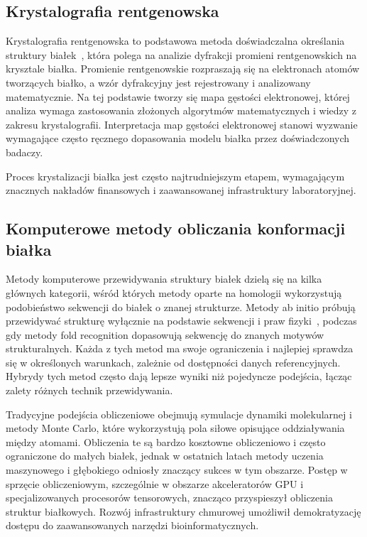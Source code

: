 \subsection{Krystalografia rentgenowska}
Krystalografia rentgenowska to podstawowa metoda doświadczalna określania struktury białek~\cite{xray_crystallography}, która polega na analizie dyfrakcji promieni rentgenowskich na krysztale białka.
Promienie rentgenowskie rozpraszają się na elektronach atomów tworzących białko, a wzór dyfrakcyjny jest rejestrowany i analizowany matematycznie.
Na tej podstawie tworzy się mapa gęstości elektronowej, której analiza wymaga zastosowania złożonych algorytmów matematycznych i wiedzy z zakresu krystalografii.
Interpretacja map gęstości elektronowej stanowi wyzwanie wymagające często ręcznego dopasowania modelu białka przez doświadczonych badaczy.

Proces krystalizacji białka jest często najtrudniejszym etapem, wymagającym znacznych nakładów finansowych i zaawansowanej infrastruktury laboratoryjnej.

\subsection{Komputerowe metody obliczania konformacji białka}
Metody komputerowe przewidywania struktury białek dzielą się na kilka głównych kategorii, wśród których metody oparte na homologii wykorzystują podobieństwo sekwencji do białek o znanej strukturze.
Metody ab initio próbują przewidywać strukturę wyłącznie na podstawie sekwencji i praw fizyki~\cite{ab_initio_protein_folding}, podczas gdy metody fold recognition dopasowują sekwencję do znanych motywów strukturalnych.
Każda z tych metod ma swoje ograniczenia i najlepiej sprawdza się w określonych warunkach, zależnie od dostępności danych referencyjnych.
Hybrydy tych metod często dają lepsze wyniki niż pojedyncze podejścia, łącząc zalety różnych technik przewidywania.

Tradycyjne podejścia obliczeniowe obejmują symulacje dynamiki molekularnej i metody Monte Carlo, które wykorzystują pola siłowe opisujące oddziaływania między atomami.
Obliczenia te są bardzo kosztowne obliczeniowo i często ograniczone do małych białek, jednak w ostatnich latach metody uczenia maszynowego i głębokiego odniosły znaczący sukces w tym obszarze.
Postęp w sprzęcie obliczeniowym, szczególnie w obszarze akceleratorów GPU i specjalizowanych procesorów tensorowych, znacząco przyspieszył obliczenia struktur białkowych.
Rozwój infrastruktury chmurowej umożliwił demokratyzację dostępu do zaawansowanych narzędzi bioinformatycznych.

